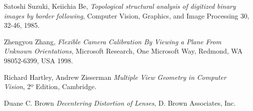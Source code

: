 \begin{thebibliography}{9}

	Satoshi Suzuki, Keiichia Be,
	\emph{Topological structural analysis of digitized binary images by border following},
	Computer Vision, Graphics, and Image Processing 30, 32-46,
	1985.

	Zhengyou Zhang,
	\emph{Flexible Camera Calibration By Viewing a Plane From Unknown Orientations},
	Microsoft Research, One Microsoft Way, Redmond, WA 98052-6399, USA
	1998.

	Richard Hartley, Andrew Zisserman
	\emph{Multiple View Geometry in Computer Vision},
	2º Edition, Cambridge.

	Duane C. Brown
	\emph{Decentering Distortion of Lenses},
	D. Brown Associates, Inc.

\end{thebibliography}